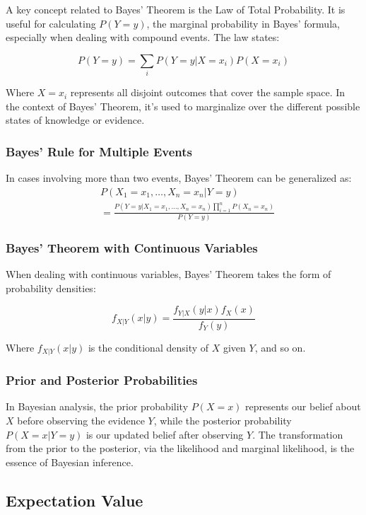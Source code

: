 \documentclass[8pt, a4paper, landscape, includeheadfoot]{extarticle}
\begin{document}
\begin{multicols*}{4}
	A key concept related to Bayes' Theorem is the Law of Total Probability. It is useful for calculating $P(Y{=}y)$, the marginal probability in Bayes' formula, especially when dealing with compound events. The law states:

	$$
		P(Y{=}y) = \sum_{i} P(Y{=}y | X{=}x_i) P(X{=}x_i)
	$$

	Where $X{=}x_i$ represents all disjoint outcomes that cover the sample space. In the context of Bayes' Theorem, it's used to marginalize over the different possible states of knowledge or evidence.

	\subsubsection{Bayes' Rule for Multiple Events}

	In cases involving more than two events, Bayes' Theorem can be generalized as:
	\begin{align*}
		 & P(X_1{=}x_1, \ldots, X_n{=}x_n | Y{=}y)                                                \\
		 & = \frac{P(Y{=}y | X_1{=}x_1, \ldots, X_n{=}x_n)\prod_{i=1}^{n} P(X_n{=}x_n)}{P(Y{=}y)}
	\end{align*}

	\subsubsection{Bayes' Theorem with Continuous Variables}

	When dealing with continuous variables, Bayes' Theorem takes the form of probability densities:

	$$
		f_{X|Y}(x|y) = \frac{f_{Y|X}(y|x) f_X(x)}{f_Y(y)}
	$$

	Where $f_{X|Y}(x|y)$ is the conditional density of $X$ given $Y$, and so on.

	\subsubsection{Prior and Posterior Probabilities}

	In Bayesian analysis, the prior probability $P(X{=}x)$ represents our belief about $X$ before observing the evidence $Y$, while the posterior probability $P(X{=}x | Y{=}y)$ is our updated belief after observing $Y$. The transformation from the prior to the posterior, via the likelihood and marginal likelihood, is the essence of Bayesian inference.

	\subsection{Expectation Value}


\end{multicols*}
\end{document}
